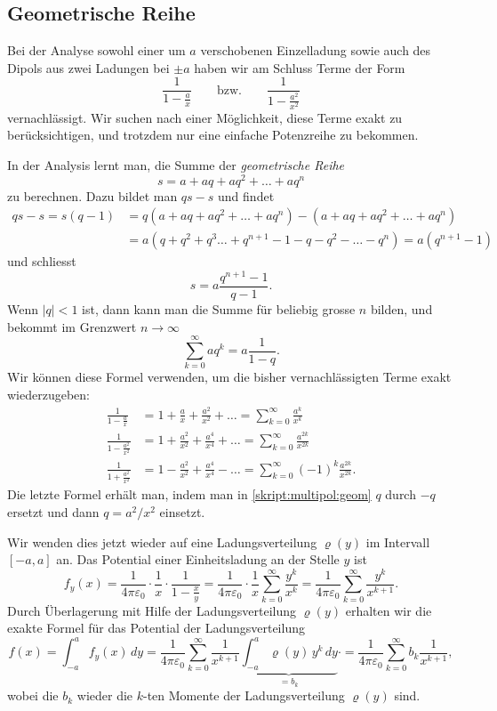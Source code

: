 \subsection{Geometrische Reihe%
\label{skript:multipol:section:geometrischereihe}}
Bei der Analyse sowohl einer um $a$ verschobenen Einzelladung sowie auch
des Dipols aus zwei Ladungen bei $\pm a$ haben wir am Schluss Terme der
Form
\[
\frac1{1-\displaystyle\frac{a}{x}}
\qquad\text{bzw.}\qquad
\frac1{1-\displaystyle\frac{a^2}{x^2}}
\]
vernachlässigt.
Wir suchen nach einer Möglichkeit, diese Terme exakt zu berücksichtigen,
und trotzdem nur eine einfache Potenzreihe zu bekommen.

In der Analysis lernt man, die Summe der {\em geometrische Reihe}
\[
s=a+aq+aq^2+\dots + aq^n
\]
zu berechnen.
Dazu bildet man $qs - s$ und findet
\begin{align*}
qs-s
=
s(q-1)
&=
q(a+aq+aq^2+\dots + aq^n)-(a+aq+aq^2+\dots + aq^n)
\\
&=
a(q+q^2+q^3\dots+q^{n+1}-1-q-q^2-\dots-q^n)
=
a(q^{n+1}-1)
\end{align*}
und schliesst
\[
s=a\frac{q^{n+1}-1}{q-1}.
\]
Wenn $|q|<1$ ist, dann kann man die Summe für beliebig grosse $n$ bilden,
und bekommt im Grenzwert $n\to\infty$
\begin{equation}
\sum_{k=0}^\infty aq^k = a\frac{1}{1-q}.
\label{skript:multipol:geom}
\end{equation}
Wir können diese Formel verwenden, um die bisher vernachlässigten Terme
exakt wiederzugeben:
\begin{align*}
\frac{1}{1-\displaystyle\frac{a}{x}}
&=
1+\frac{a}{x}+\frac{a^2}{x^2}+\dots
=
\sum_{k=0}^\infty \frac{a^k}{x^k}
\\
\frac{1}{1-\displaystyle\frac{a^2}{x^2}}
&=
1+\frac{a^2}{x^2}+\frac{a^4}{x^4}+\dots
=
\sum_{k=0}^\infty \frac{a^{2k}}{x^{2k}}
\\
\frac{1}{1+\displaystyle\frac{a^2}{x^2}}
&=
1-\frac{a^2}{x^2}+\frac{a^4}{x^4}-\dots
=
\sum_{k=0}^\infty (-1)^k\frac{a^{2k}}{x^{2k}}.
\end{align*}
Die letzte Formel erhält man, indem man in \eqref{skript:multipol:geom}
$q$ durch $-q$ ersetzt und dann $q=a^2/x^2$ einsetzt.

Wir wenden dies jetzt wieder auf eine Ladungsverteilung
$\varrho(y)$ im Intervall $[-a,a]$ an.
Das Potential einer Einheitsladung an der Stelle $y$ ist
\[
f_y(x)
=
\frac1{4\pi\varepsilon_0}\cdot \frac{1}{x}\cdot\frac{1}{1-\displaystyle\frac{x}{y}}
=
\frac1{4\pi\varepsilon_0}\cdot \frac{1}{x}
\sum_{k=0}^\infty \frac{y^k}{x^k}
=
\frac1{4\pi\varepsilon_0}
\sum_{k=0}^\infty \frac{y^k}{x^{k+1}}.
\]
Durch Überlagerung mit Hilfe der Ladungsverteilung $\varrho(y)$ 
erhalten wir die exakte Formel für das Potential der Ladungsverteilung
\begin{equation}
f(x)
=
\int_{-a}^af_y(x)\,dy
=
\frac{1}{4\pi\varepsilon_0}
\sum_{k=0}^\infty
\frac{1}{x^{k+1}}
\underbrace{\int_{-a}^a\varrho(y)\,y^k\,dy}_{\displaystyle =b_k}
\cdot
=
\frac{1}{4\pi\varepsilon_0}
\sum_{k=0}^\infty b_k
\frac{1}{x^{k+1}},
\label{skript:multipol:reiheexakte}
\end{equation}
wobei die $b_k$ wieder die $k$-ten Momente der Ladungsverteilung
$\varrho(y)$ sind.

